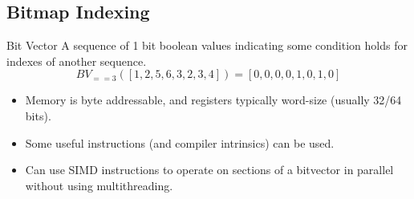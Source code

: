 \subsection{Bitmap Indexing}
\begin{definitionbox}{Bit Vector}
    A sequence of 1 bit boolean values indicating some condition holds for indexes of another sequence.
    \[BV_{==3}([1,2,5,6,3,2,3,4]) = [0,0,0,0,1,0,1,0] \]
    \begin{itemize}
        \item Memory is byte addressable, and registers typically word-size (usually 32/64 bits).
        \item Some useful instructions (and compiler intrinsics) can be used.
        \item Can use SIMD instructions to operate on sections of a bitvector in parallel without using multithreading.
    \end{itemize}
\end{definitionbox}

